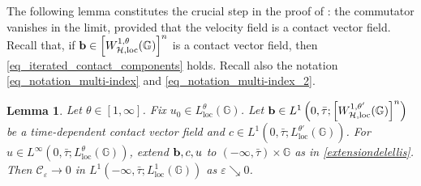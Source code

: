 \documentclass[11pt]{amsart}
\newcommand{\hhh}{{\mathcal{H}}}
\newcommand{\bb}{{\bf {b}}} %
\theoremstyle{plain}
\newtheorem{lemma}[theorem]{Lemma}
\theoremstyle{definition}
\theoremstyle{remark}
\numberwithin{equation}{section}
\begin{document}
The following lemma constitutes the crucial step in the proof of :  the commutator vanishes in the limit, provided that the velocity field is a contact vector field. Recall that, if $\bb \in \left[W^{1,\theta}_{\hhh,\mathrm{loc}}(\mathbb{G})\right]^n$ is a contact vector field, then \eqref{eq_iterated_contact_components} holds. Recall also the notation \eqref{eq_notation_multi-index} and \eqref{eq_notation_multi-index_2}.
\begin{lemma} \label{lem_commutator}
Let $\theta \in [1,\infty]$. Fix $u_0 \in L^\theta_{\mathrm{loc}}(\mathbb{G})$. Let $\bb \in L^1\left(0,\bar{\tau};\left[W^{1,\theta'}_{\hhh,\mathrm{loc}}(\mathbb{G})\right]^n\right)$ be a time-dependent contact vector field and $c \in L^1\left(0,\bar{\tau};L^{\theta'}_{\mathrm{loc}}(\mathbb{G})\right)$. For $u \in L^\infty\left(0,\bar{\tau}; L^\theta_{\mathrm{loc}}(\mathbb{G})\right)$, extend $\bb,c,u$ to $(-\infty,\bar\tau) \times \mathbb{G}$ as in \eqref{extensiondelellis}. Then  $\mathscr C_\varepsilon \to 0$ in $L^1\left(-\infty,\bar\tau; L^1_{\mathrm{loc}}(\mathbb{G})\right)$ as $\varepsilon \searrow 0$. 
\end{lemma}
\end{document}
